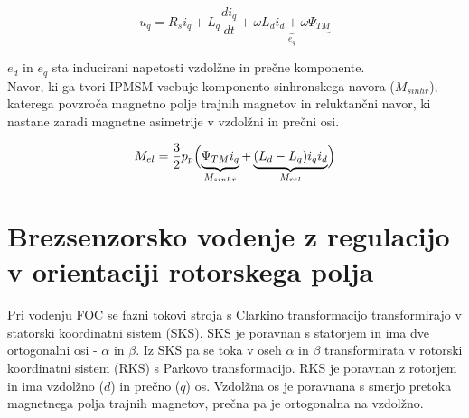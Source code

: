 \documentclass[a4paper,twoside,openright,12pt,slovene]{book}
\begin{document}
\begin{equation} \label{motorModelQ}
    u_q = R_si_q+L_q\frac{di_q}{dt}+\underbrace{\omega L_di_d + \omega\Psi_{TM}}_{e_q}
\end{equation}

$e_d$ in $e_q$ sta inducirani napetosti vzdolžne in prečne komponente. \\
Navor, ki ga tvori IPMSM vsebuje komponento sinhronskega navora ($M_{sinhr}$), katerega povzroča magnetno polje trajnih magnetov in reluktančni navor, ki nastane zaradi magnetne asimetrije v vzdolžni 
in prečni osi.

\begin{equation}
    M_{el} = \frac{3}{2}p_p\Bigl(\underbrace{\Psi_{TM}i_q}_{M_{sinhr}}+\underbrace{(L_d-L_q)i_qi_d}_{M_{rel}}\Bigr)
\end{equation}


\section{Brezsenzorsko vodenje z regulacijo v orientaciji rotorskega polja}

Pri vodenju FOC se fazni tokovi stroja s Clarkino transformacijo transformirajo v statorski koordinatni sistem (SKS). SKS je poravnan s statorjem in ima dve ortogonalni osi - $\alpha$ in $\beta$. Iz
SKS pa se toka v oseh $\alpha$ in $\beta$ transformirata v rotorski koordinatni sistem (RKS) s Parkovo transformacijo. RKS je poravnan z rotorjem in ima vzdolžno ($d$) in prečno ($q$) os. Vzdolžna
os je poravnana s smerjo pretoka magnetnega polja trajnih magnetov, prečna pa je ortogonalna na vzdolžno. 
\end{document}
